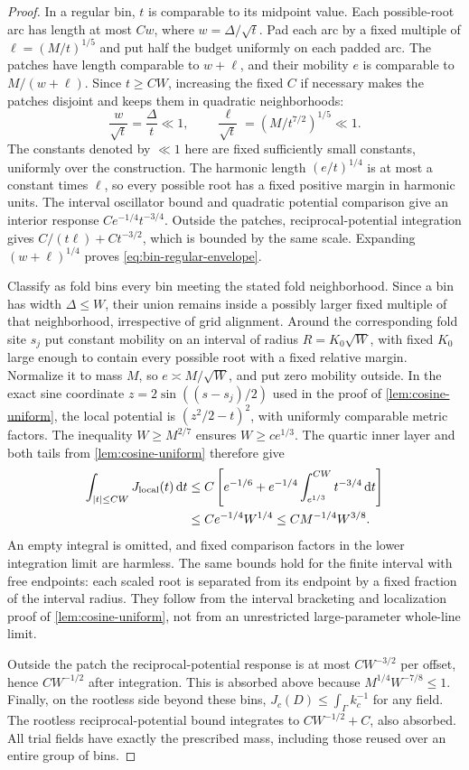 \begin{proof}
In a regular bin, $t$ is comparable to its midpoint value.
Each possible-root arc has length at most $Cw$, where
$w=\Delta/\sqrt t$. Pad each arc by a fixed multiple of
$\ell=(M/t)^{1/5}$ and put half the budget uniformly on each
padded arc. The patches have length comparable to $w+\ell$,
and their mobility $e$ is comparable to $M/(w+\ell)$. Since
$t\ge C W$, increasing the fixed $C$ if necessary makes the
patches disjoint and keeps them in quadratic neighborhoods:
\[
       \frac w{\sqrt t}=\frac\Delta t\ll1,\qquad
       \frac\ell{\sqrt t}=(M/t^{7/2})^{1/5}\ll1.
\]
The constants denoted by $\ll1$ here are fixed sufficiently
small constants, uniformly over the construction. The harmonic
length $(e/t)^{1/4}$ is at most a constant times $\ell$, so every
possible root has a fixed positive margin in harmonic units.
The interval oscillator bound and quadratic potential comparison
give an interior response $Ce^{-1/4}t^{-3/4}$. Outside the
patches, reciprocal-potential integration gives
$C/(t\ell)+Ct^{-3/2}$, which is bounded by the same scale.
Expanding $(w+\ell)^{1/4}$ proves
\eqref{eq:bin-regular-envelope}.

Classify as fold bins every bin meeting the stated fold
neighborhood. Since a bin has width $\Delta\le W$, their
union remains inside a possibly larger fixed multiple of that
neighborhood, irrespective of grid alignment. Around the
corresponding fold site $s_j$ put constant mobility on an interval
of radius $R=K_0\sqrt W$, with fixed $K_0$ large enough to
contain every possible root with a fixed relative margin.
Normalize it to mass $M$, so $e\asymp M/\sqrt W$, and put
zero mobility outside. In the exact sine coordinate
$z=2\sin((s-s_j)/2)$ used in the proof of
\cref{lem:cosine-uniform}, the local potential is
$(z^2/2-t)^2$, with uniformly comparable metric factors.
The inequality $W\ge M^{2/7}$ ensures $W\ge c e^{1/3}$.
The quartic inner layer and both tails from
\cref{lem:cosine-uniform} therefore give
\begin{align*}
 \int_{|t|\le C W}J_{\rm local}(t)\,\mathrm d t
 &\le C\left[e^{-1/6}
           +e^{-1/4}\int_{e^{1/3}}^{C W}t^{-3/4}\,\mathrm d t\right]\\
 &\le C e^{-1/4}W^{1/4}
       \le C M^{-1/4}W^{3/8}.
\end{align*}
An empty integral is omitted, and fixed comparison factors in
the lower integration limit are harmless. The same bounds hold
for the finite interval with free endpoints: each scaled root
is separated from its endpoint by a fixed fraction of the
interval radius. They follow from the interval bracketing and
localization proof of \cref{lem:cosine-uniform}, not from an
unrestricted large-parameter whole-line limit.

Outside the patch the reciprocal-potential response is at most
$CW^{-3/2}$ per offset, hence $CW^{-1/2}$ after integration.
This is absorbed above because
$M^{1/4}W^{-7/8}\le1$. Finally, on the rootless side beyond
these bins, $J_c(D)\le\int_\Gamma k_c^{-1}$ for any field.
The rootless reciprocal-potential bound integrates to
$CW^{-1/2}+C$, also absorbed. All trial fields have exactly
the prescribed mass, including those reused over an entire
group of bins.
\end{proof}

